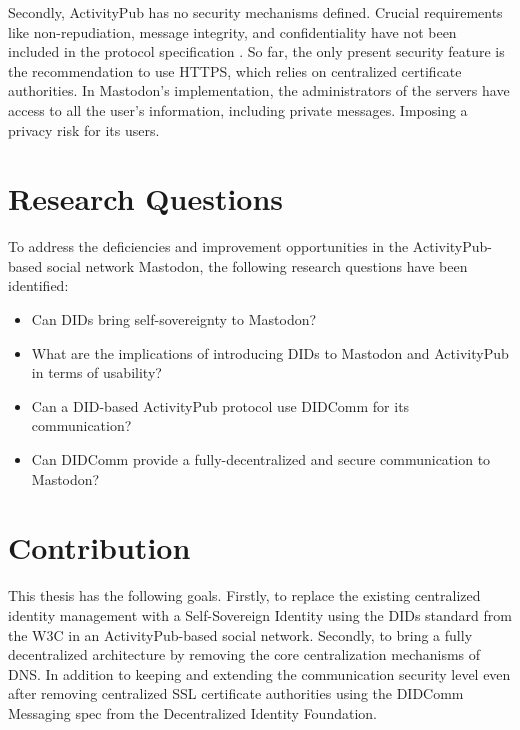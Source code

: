 Secondly, ActivityPub has no security mechanisms defined. Crucial requirements like non-repudiation, message integrity, and confidentiality have not been included in the protocol specification \cite{sporny_longley_sabadello_reed_steele_2021}. So far, the only present security feature is the recommendation to use HTTPS, which relies on centralized certificate authorities. In Mastodon's implementation, the administrators of the servers have access to all the user's information, including private messages. Imposing a privacy risk for its users. 


\section{Research Questions}
To address the deficiencies and improvement opportunities in the ActivityPub-based social network Mastodon, the following research questions have been identified: 

\begin{itemize}
  \item Can DIDs bring self-sovereignty to Mastodon?
  \item What are the implications of introducing DIDs to Mastodon and ActivityPub in terms of usability?
  \item Can a DID-based ActivityPub protocol use DIDComm for its communication?
  \item Can DIDComm provide a fully-decentralized and secure communication to Mastodon?
\end{itemize}

\section{Contribution}

This thesis has the following goals. Firstly, to replace the existing centralized identity management with a Self-Sovereign Identity using the DIDs standard from the W3C in an ActivityPub-based social network. Secondly, to bring a fully decentralized architecture by removing the core centralization mechanisms of DNS. In addition to keeping and extending the communication security level even after removing centralized SSL certificate authorities using the DIDComm Messaging spec from the Decentralized Identity Foundation. 
 
